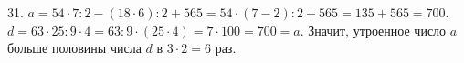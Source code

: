 31. $a=54\cdot7:2-(18\cdot6):2+565=54\cdot(7-2):2+565=135+565=700.$ $d=63\cdot25:9\cdot4=63:9\cdot(25\cdot4)=7\cdot 100=700=a.$
Значит, утроенное число $a$ больше половины числа $d$ в $3\cdot2=6$ раз.\\
